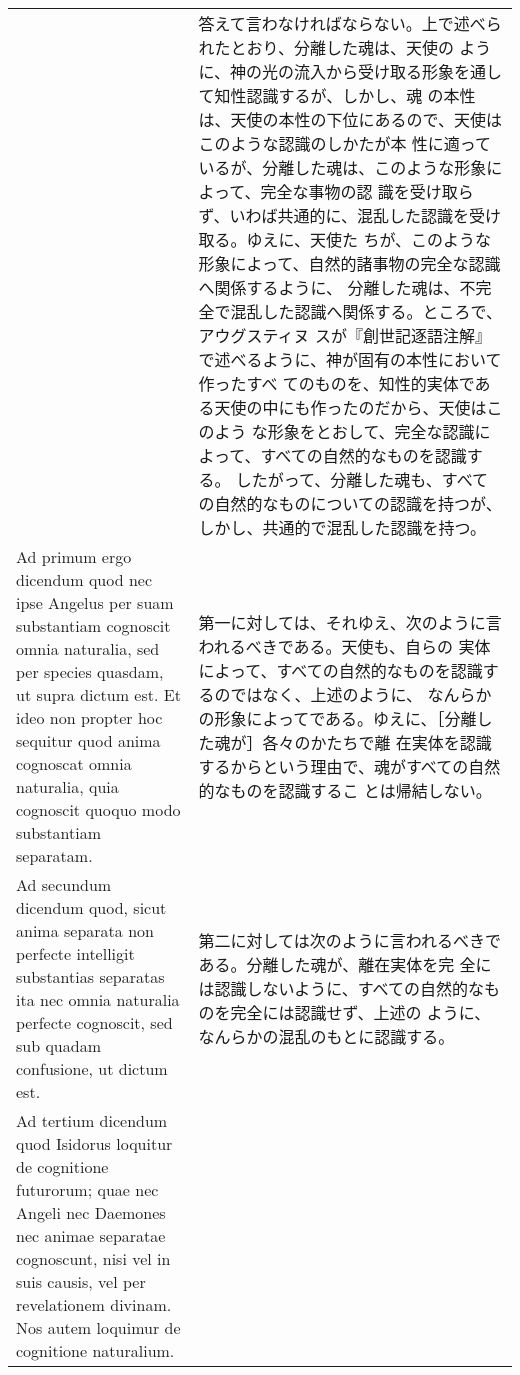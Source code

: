 \documentclass[10pt]{jsarticle} %
\begin{document}
\begin{longtable}{p{21em}p{21em}}
&

答えて言わなければならない。上で述べられたとおり、分離した魂は、天使の
ように、神の光の流入から受け取る形象を通して知性認識するが、しかし、魂
の本性は、天使の本性の下位にあるので、天使はこのような認識のしかたが本
性に適っているが、分離した魂は、このような形象によって、完全な事物の認
識を受け取らず、いわば共通的に、混乱した認識を受け取る。ゆえに、天使た
ちが、このような形象によって、自然的諸事物の完全な認識へ関係するように、
分離した魂は、不完全で混乱した認識へ関係する。ところで、アウグスティヌ
スが『創世記逐語注解』で述べるように、神が固有の本性において作ったすべ
てのものを、知性的実体である天使の中にも作ったのだから、天使はこのよう
な形象をとおして、完全な認識によって、すべての自然的なものを認識する。
したがって、分離した魂も、すべての自然的なものについての認識を持つが、
しかし、共通的で混乱した認識を持つ。


\\




{\sc Ad primum ergo dicendum} quod nec ipse Angelus per suam
substantiam cognoscit omnia naturalia, sed per species quasdam, ut
supra dictum est. Et ideo non propter hoc sequitur quod anima
cognoscat omnia naturalia, quia cognoscit quoquo modo substantiam
separatam.

&

第一に対しては、それゆえ、次のように言われるべきである。天使も、自らの
実体によって、すべての自然的なものを認識するのではなく、上述のように、
なんらかの形象によってである。ゆえに、［分離した魂が］各々のかたちで離
在実体を認識するからという理由で、魂がすべての自然的なものを認識するこ
とは帰結しない。

\\




{\sc Ad secundum dicendum} quod, sicut anima separata non perfecte
intelligit substantias separatas ita nec omnia naturalia perfecte
cognoscit, sed sub quadam confusione, ut dictum est.

&

第二に対しては次のように言われるべきである。分離した魂が、離在実体を完
全には認識しないように、すべての自然的なものを完全には認識せず、上述の
ように、なんらかの混乱のもとに認識する。

\\




{\sc Ad tertium dicendum} quod Isidorus loquitur de cognitione
futurorum; quae nec Angeli nec Daemones nec animae separatae
cognoscunt, nisi vel in suis causis, vel per revelationem divinam. Nos
autem loquimur de cognitione naturalium.


\end{longtable}
\end{document}
